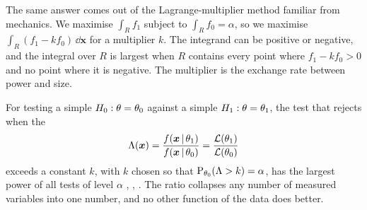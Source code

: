 The same answer comes out of the Lagrange-multiplier method familiar from
mechanics. We maximise $\int_Rf_1$ subject to $\int_Rf_0=\alpha$, so we
maximise $\int_R(f_1-kf_0)\,\dd\bm x$ for a multiplier $k$. The integrand can
be positive or negative, and the integral over $R$ is largest when $R$
contains every point where $f_1-kf_0>0$ and no point where it is negative.
The multiplier is the exchange rate between power and size.

\begin{keyidea}
For testing a simple $H_0:\theta=\theta_0$ against a simple
$H_1:\theta=\theta_1$, the test that rejects when the
\[
  \Lambda(\bm x)=\frac{f(\bm x\,\vert\,\theta_1)}{f(\bm x\,\vert\,\theta_0)}
  =\frac{\mathcal{L}(\theta_1)}{\mathcal{L}(\theta_0)}
\]
exceeds a constant $k$, with $k$ chosen so that
$\operatorname{P}_{\theta_0}(\Lambda>k)=\alpha$, has the largest power of all tests of
level $\alpha$ , ,
. The ratio collapses any number of measured variables
into one number, and no other function of the data does better.
\end{keyidea}

